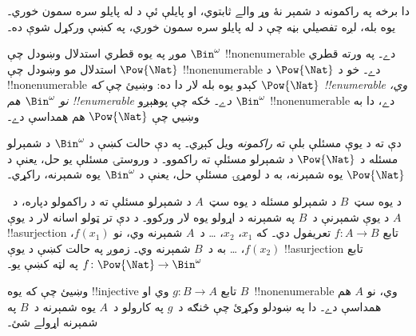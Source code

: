 \documentclass[../../../include/open-logic-section]{subfiles}
\begin{document}


\begin{editorial}
  دا برخه په راکمونه د شمېر نۀ وړ والے ثابتوي، او پايلې ئې د
   له پايلو سره سمون خوري۔ يوه بله، لږه
  تفصيلي بڼه چې د  له پايلو سره سمون خوري، په
   کښې ورکړل شوې ده۔
\end{editorial}

موږ په يوه قطري استدلال وښودل چې $\Bin^\omega$ !!{nonenumerable}
دے۔ په ورته قطري استدلال مو وښودل چې $\Pow{\Nat}$
!!{nonenumerable} دے۔ خو د $\Pow{\Nat}$ د !!{nonenumerable}
کېدو يوه بله لار دا ده: وښيئ چې \emph{که $\Pow{\Nat}$
!!{enumerable} وي، نو $\Bin^\omega$ هم !!{enumerable} دے}۔ ځکه
چې پوهېږو $\Bin^\omega$ !!{nonenumerable} دے، دا به وښيي چې
$\Pow{\Nat}$ هم همداسې دے۔

دې ته د يوې مسئلې بلې ته \emph{راکمونه} ويل کېږي۔ په دې حالت
کښې د $\Bin^\omega$ د شمېرلو مسئله د $\Pow{\Nat}$ د شمېرلو
مسئلې ته راکموو۔ د وروستۍ مسئلې يو حل، يعنې د $\Pow{\Nat}$ يوه
شمېرنه، به د لومړۍ مسئلې حل، يعنې د $\Bin^\omega$ يوه شمېرنه،
راکړي۔

د يوه سټ~$B$ د شمېرلو مسئله د يوه سټ~$A$ د شمېرلو مسئلې ته د
راکمولو دپاره، د~$A$ د يوې شمېرنې د~$B$ په شمېرنه د اړولو يوه
لار ورکوو۔ د دې تر ټولو اسانه لار د يوې !!a{surjection} تابع
$f\colon A \to B$ تعريفول دي۔ که $x_1$، $x_2$، \dots{} د~$A$
شمېرنه وي، نو $f(x_1)$، $f(x_2)$، \dots{} به د~$B$ شمېرنه وي۔
زموږ په حالت کښې د يوې !!a{surjection} تابع
$f\colon \Pow{\Nat} \to \Bin^\omega$ په لټه کښې يو۔

\begin{prob}
وښيئ چې که يوه !!{injective} تابع $g\colon B \to A$ وي او
$B$~!!{nonenumerable} وي، نو $A$ هم همداسې دے۔ دا په ښودلو
وکړئ چې څنګه د~$g$ په کارولو د~$A$ يوه شمېرنه د~$B$ په شمېرنه
اړولے شئ۔
\end{prob}
\end{document}
